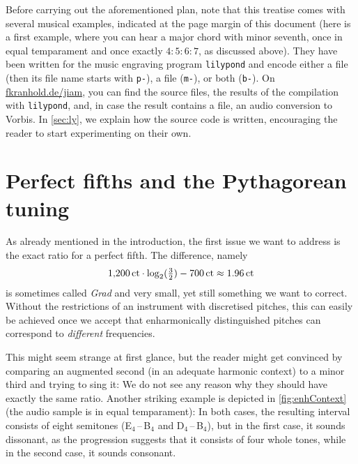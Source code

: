 \documentclass[british,11pt]{scrartcl}
\begin{document}
Before carrying out the aforementioned plan, note that this treatise comes with
several musical examples, indicated at the page margin of this document
 (here is a first example, where you can hear a major chord with
minor seventh, once in equal temparament and once exactly $4:5:6:7$, as
discussed above).  They have been written for the music engraving program
\verb!lilypond! and encode either a  file (then its file name starts
with \verb!p-!), a  file (\verb!m-!), or both (\verb!b-!).  On
\href{https://fkranhold.de/jiam/}{\textsf{fkranhold.de/jiam}}, you can find the
source files, the results of the compilation with \verb!lilypond!, and, in case
the result contains a  file, an audio conversion to 
Vorbis. In \cref{sec:ly}, we explain how the source code is written, encouraging
the reader to start experimenting on their own.

\section{Perfect fifths and the Pythagorean tuning}

As already mentioned in the introduction, the first issue we want to address is
the exact ratio for a perfect fifth. The difference, namely
\[1{,}200\,\mathrm{ct}\cdot \log_2(\tfrac32) - 700\,\mathrm{ct} \approx 1.96\,\mathrm{ct}\]%
is sometimes called \emph{Grad}
and very small, yet still something we want to correct.  Without the restrictions
of an instrument with discretised pitches, this can easily be achieved once we accept
that enharmonically distinguished pitches can correspond to \emph{different}
frequencies.

This might seem strange at first glance, but the reader might get convinced by
comparing an augmented second (in an adequate harmonic context) to a minor third
and trying to sing it: We do not see any reason why they should have exactly the
same ratio. Another striking example is depicted in \cref{fig:enhContext} (the
audio sample is in equal temparament): In both cases, the resulting interval
consists of eight semitones (\flat E$_4$\,–\,B$_4$ and \sharp D$_4$\,–\,B$_4$),
but in the first case, it sounds dissonant, as the progression suggests that it
consists of four whole tones, while in the second case, it sounds consonant.
\end{document}
